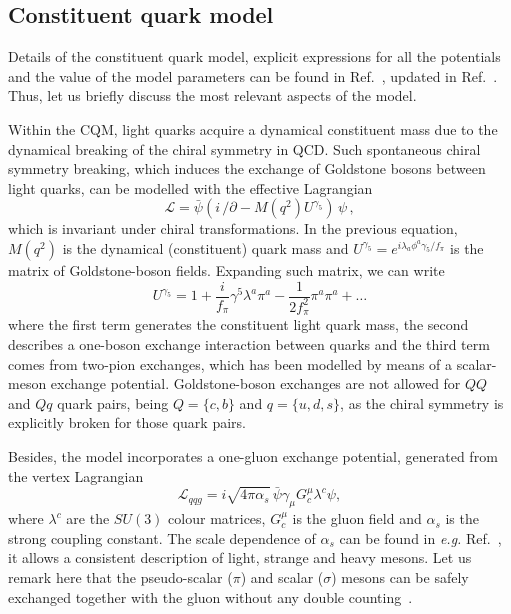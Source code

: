 \documentclass[aps, prd, floatfix, twocolumn, superscriptaddress, nofootinbib]{revtex4-1}
\begin{document}
\subsection{Constituent quark model}
\label{subsec:CQM}


Details of the constituent quark model, explicit expressions for all the potentials and the value of the model
parameters can be found in Ref.~\cite{Vijande:2004he}, updated in
Ref.~\cite{Segovia:2008zz}. Thus, let us briefly discuss the most relevant aspects of the model.

Within the CQM, light quarks acquire a dynamical constituent mass due to the dynamical breaking of the chiral
symmetry in QCD. Such spontaneous chiral symmetry breaking, which induces the exchange of Goldstone bosons between light quarks, can be modelled with the effective Lagrangian~\cite{Diakonov:2002fq}
\begin{equation}
{\mathcal L} = \bar{\psi}(i\, {\slash\!\!\! \partial}
-M(q^{2})U^{\gamma_{5}})\,\psi  \,,
\end{equation}
%
which is invariant under chiral transformations.
In the previous equation, $M(q^2)$ is the dynamical (constituent) quark mass and $U^{\gamma_5} =
e^{i\lambda _{a}\phi ^{a}\gamma _{5}/f_{\pi}}$ is the matrix of Goldstone-boson
fields. Expanding such matrix, we can write
\begin{equation}
U^{\gamma _{5}} = 1 + \frac{i}{f_{\pi}} \gamma^{5} \lambda^{a} \pi^{a} -
\frac{1}{2f_{\pi}^{2}} \pi^{a} \pi^{a} + \ldots
\end{equation}
%
where the first term generates the constituent light quark mass, the second
describes a one-boson exchange interaction between quarks and the third term
comes from two-pion exchanges, which has been modelled by means of a scalar-meson exchange potential.
Goldstone-boson exchanges are not allowed for $QQ$ and $Qq$ quark pairs, being $Q=\{c,b\}$ and $q=\{u,d,s\}$, as the chiral symmetry is explicitly broken for those quark pairs.

Besides, the model incorporates a one-gluon exchange potential, generated from the vertex
Lagrangian
\begin{equation}
{\mathcal L}_{qqg} = i\sqrt{4\pi\alpha_{s}} \, \bar{\psi} \gamma_{\mu}
G^{\mu}_{c} \lambda^{c} \psi,
\label{Lqqg}
\end{equation}
where $\lambda^{c}$ are the $SU(3)$ colour matrices, $G^{\mu}_{c}$ is the
gluon field and $\alpha_{s}$ is the strong coupling constant. The scale
dependence of $\alpha_{s}$ can be found in {\it e.g.}
Ref.~\cite{Vijande:2004he}, it allows a consistent description of light, strange
and heavy mesons.
Let us remark here that the pseudo-scalar ($\pi$) and scalar ($\sigma$) mesons can be safely exchanged together with the gluon without any double counting~\cite{Yazaki:1989rh}.
\end{document}
